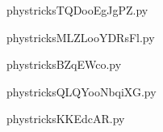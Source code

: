     

    \clearpage
    


    \newcommand{\CaptionFigTQDooEgJgPZ}{<+Type your caption here+>}
    \begin{center}
        
    \end{center}
    phystricksTQDooEgJgPZ.py

    

    \clearpage
    


    \newcommand{\CaptionFigMLZLooYDRsFl}{<+Type your caption here+>}
    \begin{center}
        
    \end{center}
    phystricksMLZLooYDRsFl.py

    

    \clearpage
    


    \newcommand{\CaptionFigBZqEWco}{<+Type your caption here+>}
    \begin{center}
        
    \end{center}
    phystricksBZqEWco.py

    

    \clearpage
    


    \newcommand{\CaptionFigQLQYooNbqiXG}{<+Type your caption here+>}
    \begin{center}
        
    \end{center}
    phystricksQLQYooNbqiXG.py

    

    \clearpage
    


    \newcommand{\CaptionFigKKEdcAR}{<+Type your caption here+>}
    \begin{center}
        
    \end{center}
    phystricksKKEdcAR.py

    

    \clearpage
    


